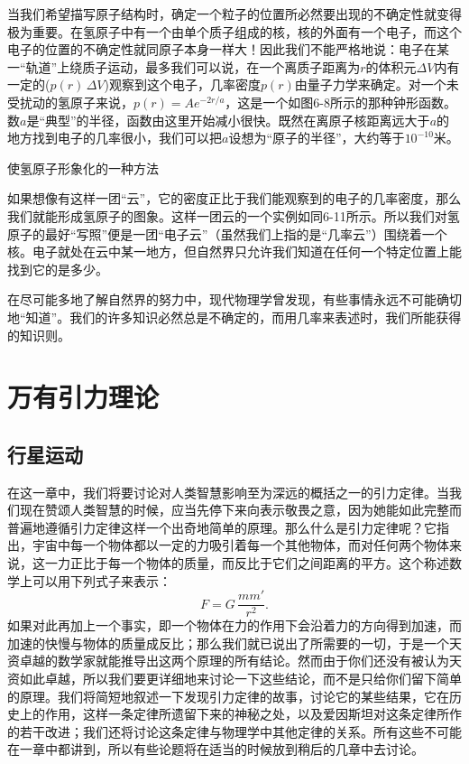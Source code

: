 \documentclass[12pt,oneside]{book}
\begin{document}
当我们希望描写原子结构时，确定一个粒子的位置所必然要出现的不确定性就变得极为重要。在氢原子中有一个由单个质子组成的核，核的外面有一个电子，而这个电子的位置的不确定性就同原子本身一样大！因此我们不能严格地说：电子在某一“轨道”上绕质子运动，最多我们可以说，在一个离质子距离为$r$的体积元$\Delta V$内有一定的($p(r)\,\Delta V$)观察到这个电子，几率密度$p(r)$由量子力学来确定。对一个未受扰动的氢原子来说，$p(r)=Ae^{-2r/a}$，这是一个如图6-8所示的那种钟形函数。数$a$是“典型”的半径，函数由这里开始减小很快。既然在离原子核距离远大于$a$的地方找到电子的几率很小，我们可以把$a$设想为“原子的半径”，大约等于$10^{-10}$米。
\begin{fig}[3]{使氢原子形象化的一种方法}
\caption{\footnotesize 使氢原子形象化的一种方法。这里云的密度(洁白度)表示能观察到电子的几率密度}
\label{fig:使氢原子形象化的一种方法}
\end{fig}

如果想像有这样一团“云”，它的密度正比于我们能观察到的电子的几率密度，那么我们就能形成氢原子的图象。这样一团云的一个实例如同6-11所示。所以我们对氢原子的最好“写照”便是一团“电子云”（虽然我们上指的是“几率云”）围绕着一个核。电子就处在云中某一地方，但自然界只允许我们知道在任何一个特定位置上能找到它的是多少。

在尽可能多地了解自然界的努力中，现代物理学曾发现，有些事情永远不可能确切地“知道”。我们的许多知识必然总是不确定的，而用几率来表述时，我们所能获得的知识则。



\chapter{万有引力理论}
\section{行星运动}
在这一章中，我们将要讨论对人类智慧影响至为深远的概括之一的引力定律。当我们现在赞颂人类智慧的时候，应当先停下来向表示敬畏之意，因为她能如此完整而普遍地遵循引力定律这样一个出奇地简单的原理。那么什么是引力定律呢？它指出，宇宙中每一个物体都以一定的力吸引着每一个其他物体，而对任何两个物体来说，这一力正比于每一个物体的质量，而反比于它们之间距离的平方。这个称述数学上可以用下列式子来表示：
\begin{equation*}
F=G\,\frac{mm'}{r^2}.
\end{equation*}
如果对此再加上一个事实，即一个物体在力的作用下会沿着力的方向得到加速，而加速的快慢与物体的质量成反比；那么我们就已说出了所需要的一切，于是一个天资卓越的数学家就能推导出这两个原理的所有结论。然而由于你们还没有被认为天资如此卓越，所以我们要更详细地来讨论一下这些结论，而不是只给你们留下简单的原理。我们将简短地叙述一下发现引力定律的故事，讨论它的某些结果，它在历史上的作用，这样一条定律所遗留下来的神秘之处，以及爱因斯坦对这条定律所作的若干改进；我们还将讨论这条定律与物理学中其他定律的关系。所有这些不可能在一章中都讲到，所以有些论题将在适当的时候放到稍后的几章中去讨论。
\end{document}
